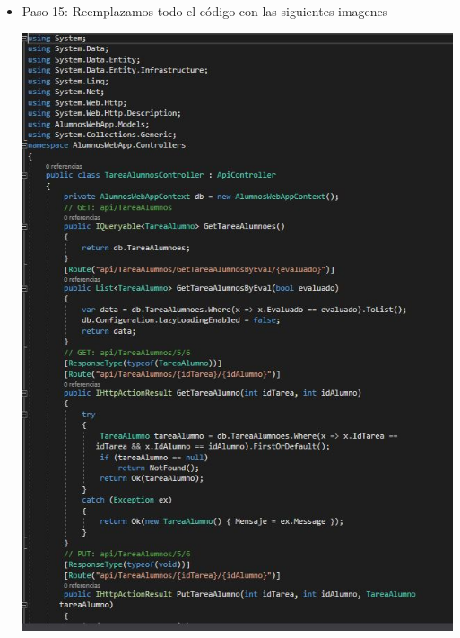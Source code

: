 \begin{itemize}
\begin{center}
	\end{center}
	\newpage
	\item Paso 15: Reemplazamos todo el código con las siguientes imagenes\\
	\begin{center}
		\includegraphics[width=15cm]{./Imagenes/Captura15}

\end{center}
\end{itemize}
